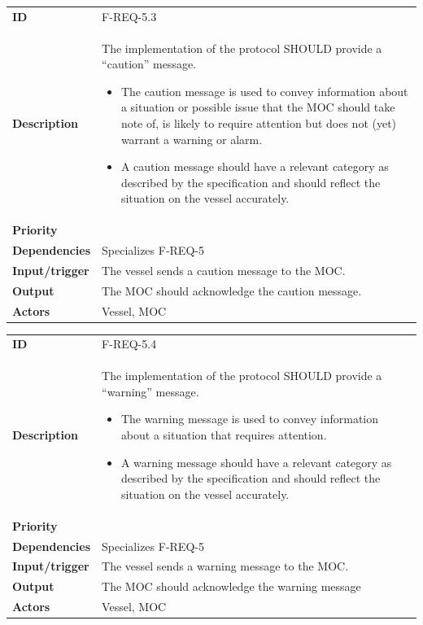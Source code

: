 \begin{table}[H]
	\centering
	\begin{tabularx}{\textwidth}{ l X }
		\rowcolor[HTML]{E7E7E7}
		\textbf{ID} & F-REQ-5.3 \\
		\textbf{Description} & The implementation of the protocol SHOULD provide a “caution” message.
		\begin{itemize}
			\item The caution message is used to convey information about a situation or possible issue that the MOC should take note of, is likely to require attention but does not (yet) warrant a warning or alarm.
			\item A caution message should have a relevant category as described by the specification and should reflect the situation on the vessel accurately.
		\end{itemize} \\
		\rowcolor[HTML]{E7E7E7}
		\textbf{Priority} & \priohigh \\
		\textbf{Dependencies} & Specializes F-REQ-5 \\
		\rowcolor[HTML]{E7E7E7}
		\textbf{Input/trigger} & The vessel sends a caution message to the MOC. \\
		\textbf{Output} & The MOC should acknowledge the caution message. \\
		\rowcolor[HTML]{E7E7E7}
		\textbf{Actors} & Vessel, MOC \\
	\end{tabularx}
	\label{table:f-req-5.3}
\end{table}

\begin{table}[H]
	\centering
	\begin{tabularx}{\textwidth}{ l X }
		\rowcolor[HTML]{E7E7E7}
		\textbf{ID} & F-REQ-5.4 \\
		\textbf{Description} & The implementation of the protocol SHOULD provide a “warning” message.
		\begin{itemize}
			\item The warning message is used to convey information about a situation that requires attention.
			\item A warning message should have a relevant category as described by the specification and should reflect the situation on the vessel accurately.
		\end{itemize} \\
		\rowcolor[HTML]{E7E7E7}
		\textbf{Priority} & \priohigh \\
		\textbf{Dependencies} & Specializes F-REQ-5 \\
		\rowcolor[HTML]{E7E7E7}
		\textbf{Input/trigger} & The vessel sends a warning message to the MOC. \\
		\textbf{Output} & The MOC should acknowledge the warning message \\
		\rowcolor[HTML]{E7E7E7}
		\textbf{Actors} & Vessel, MOC \\
	\end{tabularx}
	\label{table:f-req-5.4}
\end{table}

